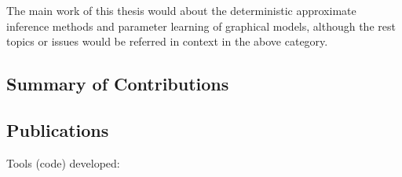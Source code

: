 The main work of this thesis would about the deterministic approximate inference methods and parameter learning of graphical models, although the rest topics or issues would be referred in  context in the above category.
\subsection{Summary of Contributions}
\cite{liu2019dominant}

\subsection{Publications}

Tools (code) developed:


